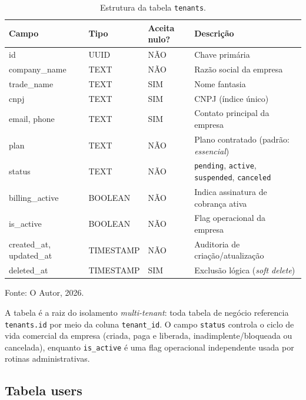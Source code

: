 \begin{table}[H]
  \centering
  \caption{Estrutura da tabela \texttt{tenants}.}
  \label{tab:tabela-tenants}
  \begin{tabular}{p{3.1cm}p{2.3cm}p{1.6cm}p{5.7cm}}
    \hline
    \textbf{Campo} & \textbf{Tipo} & \textbf{Aceita nulo?} & \textbf{Descrição} \\
    \hline
    id & UUID & NÃO & Chave primária \\
    company\_name & TEXT & NÃO & Razão social da empresa \\
    trade\_name & TEXT & SIM & Nome fantasia \\
    cnpj & TEXT & SIM & CNPJ (índice único) \\
    email, phone & TEXT & SIM & Contato principal da empresa \\
    plan & TEXT & NÃO & Plano contratado (padrão: \textit{essencial}) \\
    status & TEXT & NÃO & \texttt{pending}, \texttt{active}, \texttt{suspended}, \texttt{canceled} \\
    billing\_active & BOOLEAN & NÃO & Indica assinatura de cobrança ativa \\
    is\_active & BOOLEAN & NÃO & Flag operacional da empresa \\
    created\_at, updated\_at & TIMESTAMP & NÃO & Auditoria de criação/atualização \\
    deleted\_at & TIMESTAMP & SIM & Exclusão lógica (\textit{soft delete}) \\
    \hline
  \end{tabular}
  \begin{minipage}{0.95\textwidth}
    \vspace{0.3em}
    {\small Fonte: O Autor, 2026.}
  \end{minipage}
\end{table}

A tabela é a raiz do isolamento \textit{multi-tenant}: toda tabela de negócio referencia \texttt{tenants.id} por meio da coluna \texttt{tenant\_id}. O campo \texttt{status} controla o ciclo de vida comercial da empresa (criada, paga e liberada, inadimplente/bloqueada ou cancelada), enquanto \texttt{is\_active} é uma flag operacional independente usada por rotinas administrativas.

\subsection{Tabela users}
\label{sec:tabela-users}

